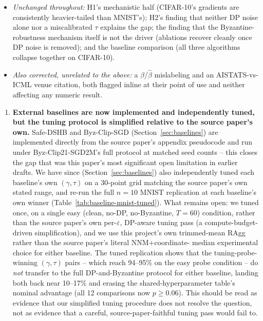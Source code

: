 \documentclass{article}
\begin{document}
\begin{itemize}
  question.
\item \emph{Unchanged throughout:} H1's mechanistic half (CIFAR-10's gradients
  are consistently heavier-tailed than MNIST's); H2's finding that neither DP
  noise alone nor a miscalibrated $\tau$ explains the gap; the finding that
  the Byzantine-robustness mechanism itself is not the driver (ablations
  recover cleanly once DP noise is removed); and the baseline comparison
  (all three algorithms collapse together on CIFAR-10).
\item \emph{Also corrected, unrelated to the above:} a $\beta$/$\hat\beta$
  mislabeling and an AISTATS-vs-ICML venue citation, both flagged inline at
  their point of use and neither affecting any numeric result.
\end{itemize}

\begin{enumerate}
\item \textbf{External baselines are now implemented and independently
  tuned, but the tuning protocol is simplified relative to the source
  paper's own.} Safe-DSHB and Byz-Clip-SGD (Section~\ref{sec:baselines}) are
  implemented directly from the source paper's appendix pseudocode and run
  under Byz-Clip21-SGD2M's full protocol at matched seed counts -- this closes
  the gap that was this paper's most significant open limitation in earlier
  drafts. We have since (Section~\ref{sec:baselines}) also independently
  tuned each baseline's own $(\gamma,\tau)$ on a 30-point grid matching the
  source paper's own stated range, and re-run the full $n{=}10$ MNIST
  replication at each baseline's own winner
  (Table~\ref{tab:baseline-mnist-tuned}). What remains open: we tuned once,
  on a single easy (clean, no-DP, no-Byzantine, $T{=}60$) condition, rather
  than the source paper's own per-$\varepsilon$, DP-aware tuning pass (a
  compute-budget-driven simplification), and we use this project's own
  trimmed-mean RAgg rather than the source paper's literal NNM+coordinate-
  median experimental choice for either baseline. The tuned replication shows
  that the tuning-probe-winning $(\gamma,\tau)$ pairs -- which reach
  94--95\% on the easy probe condition -- do \emph{not} transfer to the full
  DP-and-Byzantine protocol for either baseline, landing both back near
  10--17\% and erasing the shared-hyperparameter table's nominal advantage
  (all 12 comparisons now $p\geq0.06$). This should be read as evidence that
  our simplified tuning procedure does not resolve the question, not as
  evidence that a careful, source-paper-faithful tuning pass would fail to.

\end{enumerate}
\end{document}
